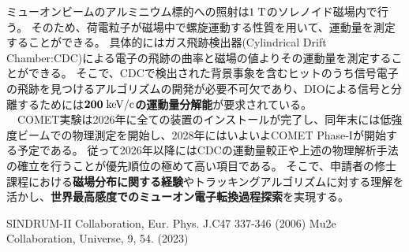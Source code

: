 \documentclass[11pt,a4j,dvipdfmx]{jarticle} 					%
\newcommand{\研究課題名}{ミューオン電子転換探索の感度向上に向けた解析手法の開発}
\newcommand{\研究機関名}{大阪大学}
\newcommand{\研究代表者氏名}{高見 翔太   }
\begin{document}
ミューオンビームのアルミニウム標的への照射は$1\;\rm{T}$のソレノイド磁場内で行う。
そのため、荷電粒子が磁場中で螺旋運動する性質を用いて、運動量を測定することができる。
具体的にはガス飛跡検出器(Cylindrical Drift Chamber:CDC)による電子の飛跡の曲率と磁場の値よりその運動量を測定することができる。
そこで、CDCで検出された背景事象を含むヒットのうち信号電子の飛跡を見つけるアルゴリズムの開発が必要不可欠であり、DIOによる信号と分離するためには\textbf{$\mathbf{200\;\rm{keV/c}}$の運動量分解能}が要求されている。\\
　COMET実験は2026年に全ての装置のインストールが完了し、同年末には低強度ビームでの物理測定を開始し、2028年にはいよいよCOMET Phase-Iが開始する予定である。
従って2026年以降にはCDCの運動量較正や上述の物理解析手法の確立を行うことが優先順位の極めて高い項目である。
そこで、申請者の修士課程における\textbf{磁場分布に関する経験}やトラッキングアルゴリズムに対する理解を活かし、\textbf{世界最高感度でのミューオン電子転換過程探索}を実現する。

\small
\begin{thebibliography}{99}
	 SINDRUM-II Collaboration, Eur. Phys. J.C47 337-346 (2006)
	Mu2e Collaboration, Universe, 9, 54. (2023) 
\end{thebibliography}













\end{document}
